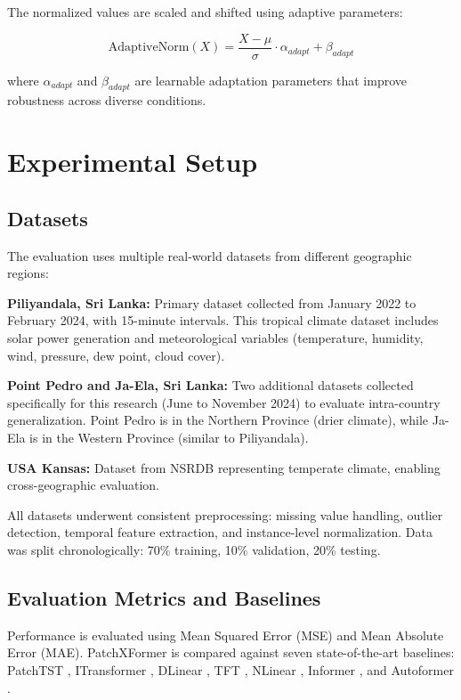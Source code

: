 \documentclass[conference]{IEEEtran}
\begin{document}
The normalized values are scaled and shifted using adaptive parameters:

\begin{equation}
\text{AdaptiveNorm}(X) = \frac{X - \mu}{\sigma} \cdot \alpha_{adapt} + \beta_{adapt}
\end{equation}

where $\alpha_{adapt}$ and $\beta_{adapt}$ are learnable adaptation parameters that improve robustness across diverse conditions.

\section{Experimental Setup}

\subsection{Datasets}

The evaluation uses multiple real-world datasets from different geographic regions:

\textbf{Piliyandala, Sri Lanka:} Primary dataset collected from January 2022 to February 2024, with 15-minute intervals. This tropical climate dataset includes solar power generation and meteorological variables (temperature, humidity, wind, pressure, dew point, cloud cover).

\textbf{Point Pedro and Ja-Ela, Sri Lanka:} Two additional datasets collected specifically for this research (June to November 2024) to evaluate intra-country generalization. Point Pedro is in the Northern Province (drier climate), while Ja-Ela is in the Western Province (similar to Piliyandala).

\textbf{USA Kansas:} Dataset from NSRDB \cite{NSRDB} representing temperate climate, enabling cross-geographic evaluation.

All datasets underwent consistent preprocessing: missing value handling, outlier detection, temporal feature extraction, and instance-level normalization. Data was split chronologically: 70\% training, 10\% validation, 20\% testing.

\subsection{Evaluation Metrics and Baselines}

Performance is evaluated using Mean Squared Error (MSE) and Mean Absolute Error (MAE). PatchXFormer is compared against seven state-of-the-art baselines: PatchTST \cite{nie2022patchtst}, ITransformer \cite{liu2023itransformer}, DLinear \cite{zeng2023transformers}, TFT \cite{lim2021temporal}, NLinear \cite{zeng2023transformers}, Informer \cite{zhou2021informer}, and Autoformer \cite{wu2021autoformer}.
\end{document}
